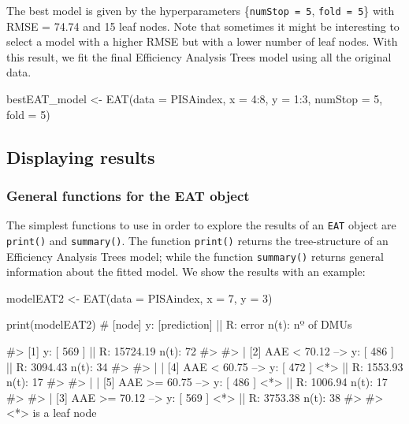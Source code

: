 The best model is given by the hyperparameters \{\texttt{numStop\ =\ 5},
\texttt{fold\ =\ 5}\} with RMSE = 74.74 and 15 leaf nodes. Note that
sometimes it might be interesting to select a model with a higher RMSE
but with a lower number of leaf nodes. With this result, we fit the
final Efficiency Analysis Trees model using all the original data.

\begin{Schunk}
\begin{Sinput}
bestEAT_model <- EAT(data = PISAindex, x = 4:8, y = 1:3, numStop = 5, fold = 5)
\end{Sinput}
\end{Schunk}

\hypertarget{displaying-results}{%
\subsection{Displaying results}\label{displaying-results}}

\hypertarget{general-functions-for-the-eat-object}{%
\subsubsection{General functions for the EAT
object}\label{general-functions-for-the-eat-object}}

The simplest functions to use in order to explore the results of an
\texttt{EAT} object are \texttt{print()} and \texttt{summary()}. The
function \texttt{print()} returns the tree-structure of an Efficiency
Analysis Trees model; while the function \texttt{summary()} returns
general information about the fitted model. We show the results with an
example:

\begin{Schunk}
\begin{Sinput}
modelEAT2 <- EAT(data = PISAindex, x = 7, y = 3)
\end{Sinput}
\end{Schunk}

\begin{Schunk}
\begin{Sinput}
print(modelEAT2) # [node] y: [prediction] || R: error n(t): nº of DMUs
\end{Sinput}
\begin{Soutput}
#>  [1] y: [ 569 ] || R: 15724.19 n(t): 72 
#>  
#>  |  [2] AAE < 70.12 --> y: [ 486 ] || R: 3094.43 n(t): 34 
#>  
#>  |   |  [4] AAE < 60.75 --> y: [ 472 ] <*> || R: 1553.93 n(t): 17 
#>  
#>  |   |  [5] AAE >= 60.75 --> y: [ 486 ] <*> || R: 1006.94 n(t): 17 
#>  
#>  |  [3] AAE >= 70.12 --> y: [ 569 ] <*> || R: 3753.38 n(t): 38 
#>  
#> <*> is a leaf node
\end{Soutput}
\end{Schunk}

